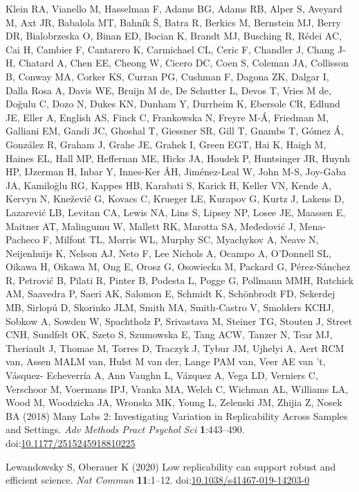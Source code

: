 \documentclass[
  english,
  a4paper,
]{article}
\newlength{\cslhangindent}
\newlength{\cslentryspacingunit} %
\newenvironment{CSLReferences}[2] %
 {%
  \setlength{\parindent}{0pt}
  \ifodd #1
  \let\oldpar\par
  \def\par{\hangindent=\cslhangindent\oldpar}
  \fi
  \setlength{\parskip}{#2\cslentryspacingunit}
 }%
 {}
\begin{document}
\begin{CSLReferences}{1}{0}
\leavevmode{}%
Klein RA, Vianello M, Hasselman F, Adams BG, Adams RB, Alper S, Aveyard M, Axt JR, Babalola MT, Bahník Š, Batra R, Berkics M, Bernstein MJ, Berry DR, Bialobrzeska O, Binan ED, Bocian K, Brandt MJ, Busching R, Rédei AC, Cai H, Cambier F, Cantarero K, Carmichael CL, Ceric F, Chandler J, Chang J-H, Chatard A, Chen EE, Cheong W, Cicero DC, Coen S, Coleman JA, Collisson B, Conway MA, Corker KS, Curran PG, Cushman F, Dagona ZK, Dalgar I, Dalla Rosa A, Davis WE, Bruijn M de, De Schutter L, Devos T, Vries M de, Doğulu C, Dozo N, Dukes KN, Dunham Y, Durrheim K, Ebersole CR, Edlund JE, Eller A, English AS, Finck C, Frankowska N, Freyre M-Á, Friedman M, Galliani EM, Gandi JC, Ghoshal T, Giessner SR, Gill T, Gnambs T, Gómez Á, González R, Graham J, Grahe JE, Grahek I, Green EGT, Hai K, Haigh M, Haines EL, Hall MP, Heffernan ME, Hicks JA, Houdek P, Huntsinger JR, Huynh HP, IJzerman H, Inbar Y, Innes-Ker ÅH, Jiménez-Leal W, John M-S, Joy-Gaba JA, Kamiloğlu RG, Kappes HB, Karabati S, Karick H, Keller VN, Kende A, Kervyn N, Knežević G, Kovacs C, Krueger LE, Kurapov G, Kurtz J, Lakens D, Lazarević LB, Levitan CA, Lewis NA, Lins S, Lipsey NP, Losee JE, Maassen E, Maitner AT, Malingumu W, Mallett RK, Marotta SA, Međedović J, Mena-Pacheco F, Milfont TL, Morris WL, Murphy SC, Myachykov A, Neave N, Neijenhuijs K, Nelson AJ, Neto F, Lee Nichols A, Ocampo A, O'Donnell SL, Oikawa H, Oikawa M, Ong E, Orosz G, Osowiecka M, Packard G, Pérez-Sánchez R, Petrović B, Pilati R, Pinter B, Podesta L, Pogge G, Pollmann MMH, Rutchick AM, Saavedra P, Saeri AK, Salomon E, Schmidt K, Schönbrodt FD, Sekerdej MB, Sirlopú D, Skorinko JLM, Smith MA, Smith-Castro V, Smolders KCHJ, Sobkow A, Sowden W, Spachtholz P, Srivastava M, Steiner TG, Stouten J, Street CNH, Sundfelt OK, Szeto S, Szumowska E, Tang ACW, Tanzer N, Tear MJ, Theriault J, Thomae M, Torres D, Traczyk J, Tybur JM, Ujhelyi A, Aert RCM van, Assen MALM van, Hulst M van der, Lange PAM van, Veer AE van 't, Vásquez- Echeverría A, Ann Vaughn L, Vázquez A, Vega LD, Verniers C, Verschoor M, Voermans IPJ, Vranka MA, Welch C, Wichman AL, Williams LA, Wood M, Woodzicka JA, Wronska MK, Young L, Zelenski JM, Zhijia Z, Nosek BA (2018) Many {Labs} 2: {Investigating Variation} in {Replicability Across Samples} and {Settings}. \emph{Adv Methods Pract Psychol Sci} \textbf{1}:443--490. doi:\href{https://doi.org/10.1177/2515245918810225}{10.1177/2515245918810225}

\leavevmode{}%
Lewandowsky S, Oberauer K (2020) Low replicability can support robust and efficient science. \emph{Nat Commun} \textbf{11}:1--12. doi:\href{https://doi.org/10.1038/s41467-019-14203-0}{10.1038/s41467-019-14203-0}


\end{CSLReferences}
\end{document}
